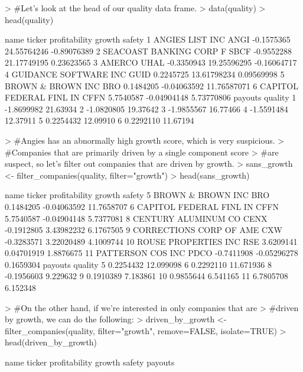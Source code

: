 \documentclass[12pt]{article}
\begin{document}
\begin{Schunk}
\begin{Sinput}
> #Let's look at the head of our quality data frame.
> data(quality)
> head(quality)
\end{Sinput}
\begin{Soutput}
                     name ticker profitability      growth      safety
1         ANGIES LIST INC   ANGI    -0.1575365 24.55764246 -0.89076389
2 SEACOAST BANKING CORP F   SBCF    -0.9552288 21.17749195  0.23623565
3                  AMERCO   UHAL    -0.3350943 19.25596295 -0.16064717
4   GUIDANCE SOFTWARE INC   GUID     0.2245725 13.61798234  0.09569998
5       BROWN & BROWN INC    BRO     0.1484205 -0.04063592 11.76587071
6 CAPITOL FEDERAL FINL IN   CFFN     5.7540587 -0.04904148  5.73770806
     payouts  quality
1 -1.8699982 21.63934
2 -1.0820805 19.37642
3 -1.9855567 16.77466
4 -1.5591484 12.37911
5  0.2254432 12.09910
6  0.2292110 11.67194
\end{Soutput}
\begin{Sinput}
> #Angies has an abnormally high growth score, which is very suspicious.
> #Companies that are primarily driven by a single component score 
> #are suspect, so let's filter out companies that are driven by growth.
> sans_growth <- filter_companies(quality, filter="growth")
> head(sans_growth)
\end{Sinput}
\begin{Soutput}
                      name ticker profitability      growth     safety
5        BROWN & BROWN INC    BRO     0.1484205 -0.04063592 11.7658707
6  CAPITOL FEDERAL FINL IN   CFFN     5.7540587 -0.04904148  5.7377081
8      CENTURY ALUMINUM CO   CENX    -0.1912805  3.43982232  6.1767505
9  CORRECTIONS CORP OF AME    CXW    -0.3283571  3.22020489  4.1009744
10    ROUSE PROPERTIES INC    RSE     3.6209141  0.04701919  1.8876675
11       PATTERSON COS INC   PDCO    -0.7411908 -0.05296278  0.1659304
      payouts   quality
5   0.2254432 12.099098
6   0.2292110 11.671936
8  -0.1956603  9.229632
9   0.1910389  7.183861
10  0.9855644  6.541165
11  6.7805708  6.152348
\end{Soutput}
\begin{Sinput}
> #On the other hand, if we're interested in only companies that are 
> #driven by growth, we can do the following:
> driven_by_growth <- filter_companies(quality, filter="growth", remove=FALSE, isolate=TRUE)
> head(driven_by_growth)
\end{Sinput}
\begin{Soutput}
                      name ticker profitability   growth      safety    payouts

\end{Soutput}
\end{Schunk}
\end{document}
